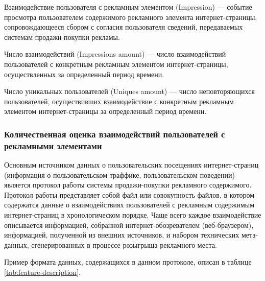 Взаимодействие пользователя с рекламным элементом (Impression) --- событие просмотра пользователем содержимого
рекламного элемента интернет-страницы, сопровождающееся сбором с согласия пользователя сведений, передаваемых 
системам продажи-покупки рекламы.

Число взаимодействий (Impressions amount) --- число взаимодействий пользователей с конкретным рекламным элементом
интернет-страницы, осуществленных за определенный период времени.

Число уникальных пользователей (Uniques amount) --- число неповторяющихся пользователей, осуществивших взаимодействие
с конкретным рекламным элементом интернет-страницы за определенный период времени.

\subsubsection{Количественная оценка взаимодействий пользователей с рекламными элементами}

Основным источником данных о пользовательских посещениях интернет-страниц (информация о пользовательском траффике,
пользовательском поведении) является протокол работы системы продажи-покупки рекламного содержимого. Протокол работы
представляет собой файл или совокупность файлов, в котором содержатся данные о взаимодействиях пользователей с
рекламным содержимым интернет-страниц в хронологическом порядке. Чаще всего каждое взаимодействие описывается информацией,
собранной интернет-обозревателем (веб-браузером), информацией, полученной из внешних источников, и набором технических
мета-данных, сгенерированных в процессе розыгрыша рекламного места. 

Пример формата данных, содержащихся в данном протоколе, описан в таблице \ref{tab:feature-description}.


